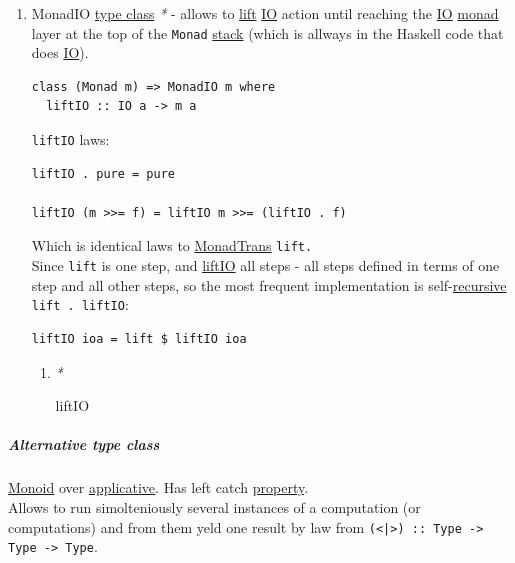 \documentclass[11pt]{article}
\begin{document}
\begin{enumerate}
\begin{enumerate}
\begin{enumerate}
\item \label{org7ca0a40}MonadIO \hyperref[orga4a5066]{type class}
\label{sec:org4f0808c}
\emph{*} - allows to \hyperref[org70ed855]{lift} \hyperref[org79ee7d8]{IO} action until reaching the \hyperref[org79ee7d8]{IO} \hyperref[org268aaf1]{monad} layer at the top of the \texttt{Monad} \hyperref[org901a5a9]{stack} (which is allways in the Haskell code that does \hyperref[org79ee7d8]{IO}).\\

\begin{verbatim}
class (Monad m) => MonadIO m where
  liftIO :: IO a -> m a
\end{verbatim}

\texttt{liftIO} laws:\\
\begin{verbatim}
liftIO . pure = pure

liftIO (m >>= f) = liftIO m >>= (liftIO . f)
\end{verbatim}

Which is identical laws to \hyperref[orgf4a83bb]{MonadTrans} \texttt{lift.}\\

Since \texttt{lift} is one step, and \hyperref[orgb989ff9]{liftIO} all steps - all steps defined in terms of one step and all other steps, so the most frequent implementation is self-\hyperref[org06bac4d]{recursive} \texttt{lift . liftIO}:\\

\begin{verbatim}
liftIO ioa = lift $ liftIO ioa
\end{verbatim}

\begin{enumerate}
\item \emph{*}
\label{sec:org96febfd}

\label{orgb989ff9}liftIO\\
\end{enumerate}
\end{enumerate}
\end{enumerate}
\end{enumerate}

\subparagraph{\label{org91dee0b}Alternative type class}
\label{sec:orgeb2ef32}
\hyperref[org8ff50ea]{Monoid} over \hyperref[org24a6930]{applicative}. Has left catch \hyperref[org07ca26b]{property}.\\

Allows to run simolteniously several instances of a computation (or computations) and from them yeld one result by law from \texttt{(<|>) :: Type -> Type -> Type}.\\
\end{document}
